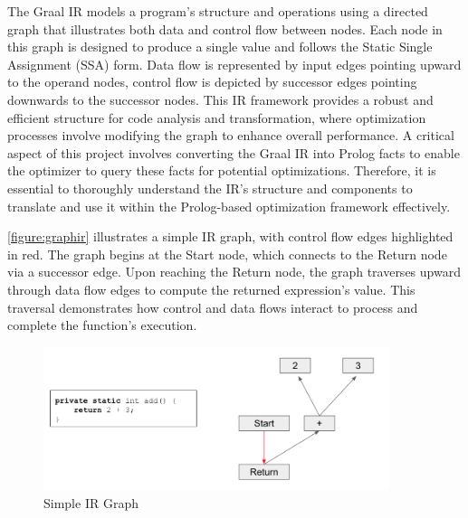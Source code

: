 The Graal IR \cite{Duboscq2013} models a program's structure and operations using a directed graph that illustrates both data and control flow between nodes. Each node in this graph is designed to produce a single value and follows the Static Single Assignment (SSA) \cite{Ron1991} form. Data flow is represented by input edges pointing upward to the operand nodes, control flow is depicted by successor edges pointing downwards to the successor nodes. This IR framework provides a robust and efficient structure for code analysis and transformation, where optimization processes involve modifying the graph to enhance overall performance. A critical aspect of this project involves converting the Graal IR into Prolog facts to enable the optimizer to query these facts for potential optimizations. Therefore, it is essential to thoroughly understand the IR's structure and components to translate and use it within the Prolog-based optimization framework effectively.

\autoref{figure:graphir} illustrates a simple IR graph, with control flow edges highlighted in red. The graph begins at the Start node, which connects to the Return node via a successor edge. Upon reaching the Return node, the graph traverses upward through data flow edges to compute the returned expression’s value. This traversal demonstrates how control and data flows interact to process and complete the function's execution.

\begin{figure}[h]
    \centering
    \includegraphics[width=0.9\textwidth]{Packages/graphir.png}
    \caption{Simple IR Graph}
    \label{figure:graphir}
\end{figure}

